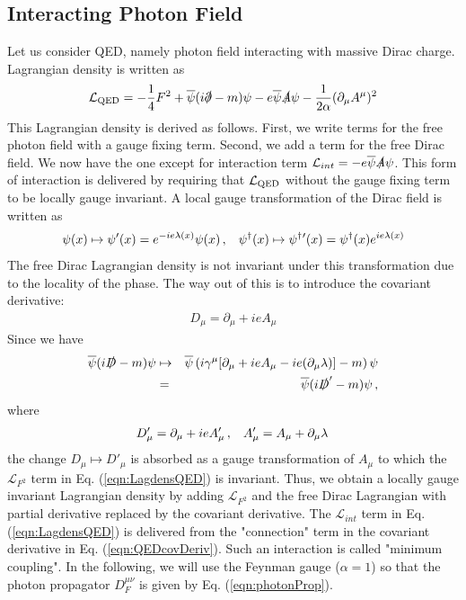 \subsection{Interacting Photon Field}
Let us consider QED, namely photon field interacting with massive Dirac charge.
Lagrangian density is written as
\begin{eqnarray}
{\cal L}_{\mbox{\scriptsize QED}}
 = 
-\frac{1}{4} F^2
+ \overline{\psi}(i \slashed{\partial} - m) \psi
- e \overline{\psi} \slashed{A} \psi
-\frac{1}{2\alpha} (\partial_\mu A^\mu)^2
\label{eqn:LagdensQED}
\end{eqnarray}
This Lagrangian density is derived as follows. First, we write terms
for the free photon field with a gauge fixing term. Second, we add
a term for the free Dirac field. We now have the one except for 
interaction term $\mathcal{L}_{int} = - e \overline{\psi} \slashed{A} \psi$.
This form of interaction is delivered by requiring that
$\mathcal{L}_{\mbox{\scriptsize QED}}$
without the gauge fixing term
to be locally gauge invariant. A local gauge transformation of the Dirac field is
written as
\begin{eqnarray}
\psi (x) \mapsto \psi' (x) = e^{-ie \lambda(x)} \psi(x)
\,,
\hspace{3mm}
\psi^\dagger  (x) \mapsto  \psi^{\dagger}{}' (x)
=
\psi^\dagger  (x) e^{ie \lambda(x)}
\end{eqnarray}
The free Dirac Lagrangian density is not invariant under this transformation
due to the locality of the phase.
The way out of this is to introduce the covariant derivative:
\begin{eqnarray}
D_\mu = \partial_\mu + ie A_\mu
\label{eqn:QEDcovDeriv}
\end{eqnarray}
Since we have
\begin{eqnarray}
 \overline{\psi}(i \slashed{D} - m) \psi
&\mapsto&
 \overline{\psi}
 \left(
 i \gamma^\mu [\partial_\mu + ie A_\mu - i e (\partial_\mu \lambda)]
 - m
 \right)
 \psi
 \nonumber\\
 &=&
 \overline{\psi}
(i \slashed{D}' - m) \psi
\,,
\end{eqnarray}
where
\begin{eqnarray}
D_\mu' = \partial_\mu + ieA_\mu'
\,,
\hspace{3mm}
A_\mu' = A_\mu + \partial_\mu \lambda
\,
 \end{eqnarray}
 the change $D_\mu \mapsto D'_\mu$ is absorbed as a gauge transformation
 of $A_\mu$
 to which the $\mathcal{L}_{F^2}$ term in Eq. (\ref{eqn:LagdensQED}) is
 invariant. Thus, we obtain a locally gauge invariant Lagrangian density
 by adding $\mathcal{L}_{F^2}$ and the free Dirac Lagrangian with
 partial derivative replaced by the covariant derivative.
 The $\mathcal{L}_{int}$ term in Eq. (\ref{eqn:LagdensQED}) is
 delivered from the "connection" term in the covariant derivative in
Eq. (\ref{eqn:QEDcovDeriv}). Such an interaction is called
"minimum coupling".
In the following, we will use the Feynman gauge ($\alpha = 1$) so that
the photon propagator $D_F^{\mu \nu}$ is given by Eq. (\ref{eqn:photonProp}).
 